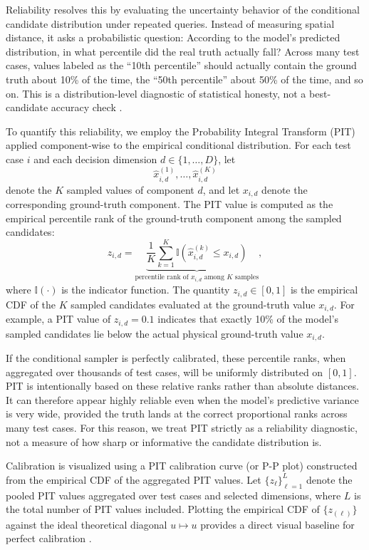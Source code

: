 Reliability resolves this by evaluating the uncertainty behavior of the conditional candidate distribution under repeated queries. Instead of measuring spatial distance, it asks a probabilistic question: According to the model's predicted distribution, in what percentile did the real truth actually fall? Across many test cases, values labeled as the ``10th percentile'' should actually contain the ground truth about 10\% of the time, the ``50th percentile'' about 50\% of the time, and so on. This is a distribution-level diagnostic of statistical honesty, not a best-candidate accuracy check \cite{Diebold1998}.

To quantify this reliability, we employ the Probability Integral Transform (PIT) applied component-wise to the empirical conditional distribution. For each test case $i$ and each decision dimension $d \in \{1, \dots, D\}$, let
$$
  \widehat{x}^{(1)}_{i,d}, \dots, \widehat{x}^{(K)}_{i,d}
$$
denote the $K$ sampled values of component $d$, and let $x_{i,d}$ denote the corresponding ground-truth component. The PIT value is computed as the empirical percentile rank of the ground-truth component among the sampled candidates:
\begin{equation}
  z_{i,d} = \underbrace{\frac{1}{K}\sum_{k=1}^{K}\mathbb{I}\!\left(\widehat{x}^{(k)}_{i,d}\le x_{i,d}\right)}_{\text{percentile rank of }x_{i,d}\text{ among }K\text{ samples}},
  \label{eq:pit_empirical}
\end{equation}
where $\mathbb{I}(\cdot)$ is the indicator function. The quantity $z_{i,d}\in[0,1]$ is the empirical CDF of the $K$ sampled candidates evaluated at the ground-truth value $x_{i,d}$. For example, a PIT value of $z_{i,d}=0.1$ indicates that exactly 10\% of the model's sampled candidates lie below the actual physical ground-truth value $x_{i,d}$. 

If the conditional sampler is perfectly calibrated, these percentile ranks, when aggregated over thousands of test cases, will be uniformly distributed on $[0,1]$. PIT is intentionally based on these relative ranks rather than absolute distances. It can therefore appear highly reliable even when the model's predictive variance is very wide, provided the truth lands at the correct proportional ranks across many test cases. For this reason, we treat PIT strictly as a reliability diagnostic, not a measure of how sharp or informative the candidate distribution is.

Calibration is visualized using a PIT calibration curve (or P-P plot) constructed from the empirical CDF of the aggregated PIT values. Let $\{z_{\ell}\}_{\ell=1}^{L}$ denote the pooled PIT values aggregated over test cases and selected dimensions, where $L$ is the total number of PIT values included. Plotting the empirical CDF of $\{z_{(\ell)}\}$ against the ideal theoretical diagonal $u\mapsto u$ provides a direct visual baseline for perfect calibration \cite{dawid1984statistical}. 

